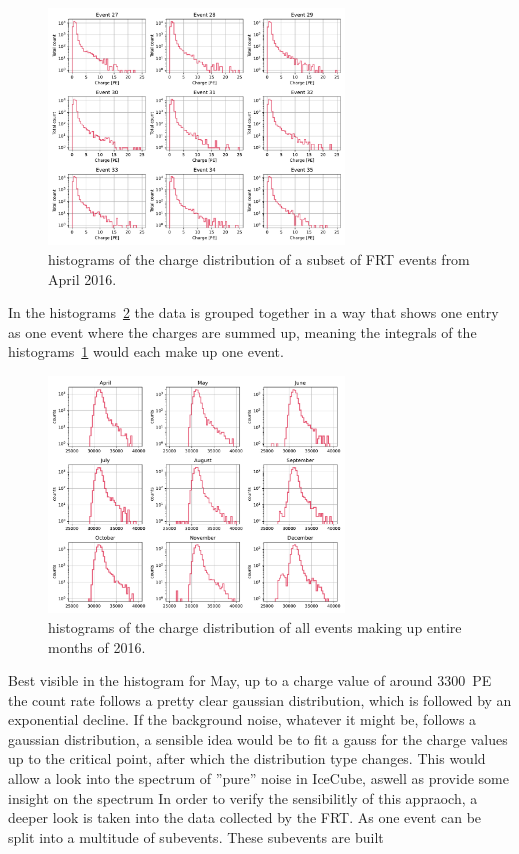 \begin{figure}
    \centering
    \includegraphics[width=0.7\textwidth]{Plots/single_charge_hist.pdf}
    \caption{histograms of the charge distribution of a subset of FRT events from April 2016.}
    \label{fig:single_charge_hist}
\end{figure}

In the histograms~\ref{fig:monthly_charge_hist} the data is grouped together in a way that shows one entry as one event where the charges are summed up, meaning the 
integrals of the histograms~\ref{fig:single_charge_hist} would each make up one event. 

\begin{figure}
    \centering
    \includegraphics[width=0.7\textwidth]{Plots/monthly_charge_hist.pdf}
    \caption{histograms of the charge distribution of all events making up entire months of 2016.}
    \label{fig:monthly_charge_hist}
\end{figure}

Best visible in the histogram for May, up to a charge value of around \SI{3300}{PE} the count rate follows a pretty clear gaussian distribution, which is followed 
by an exponential decline. If the background noise, whatever it might be, follows a gaussian distribution, a sensible idea would be to fit a gauss for the charge 
values up to the critical point, after which the distribution type changes. This would allow a look into the spectrum of ''pure'' noise in IceCube, aswell as provide 
some insight on the spectrum
In order to verify the sensibilitly of this appraoch, a deeper look is taken into the data collected by the FRT. As one event can be split into 
a multitude of subevents. These subevents are built 

